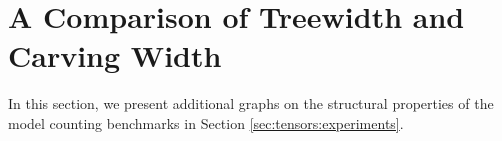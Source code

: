 \section{A Comparison of Treewidth and Carving Width}
\label{sec:tensors:experiments:graph_analysis}

In this section, we present additional graphs on the structural properties of the model counting benchmarks in Section \ref{sec:tensors:experiments}.





